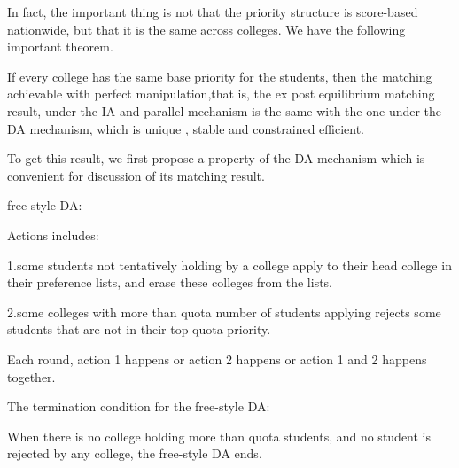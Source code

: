 In fact, the important thing is not that the priority structure is score-based nationwide, but that it is the same across colleges.
We have the following important theorem.

\begin{thm}\label{same}
If every college has the same base priority for the students, then the matching achievable with perfect
manipulation,that is, the ex post equilibrium matching result,  under the IA and parallel mechanism  is the same with the one under the DA mechanism, which is unique , stable and constrained efficient. 
\end{thm}











To get this result, we first propose a property of the DA mechanism which is convenient for discussion of its matching result.
\begin{definition}
  free-style DA:
  
  Actions includes:
  
  1.some students not tentatively holding by a college apply to their head college in their preference lists, and erase these colleges from the lists.
  
  2.some colleges with more than quota number of students applying rejects some students that are not in their top quota priority.

  Each round, action 1 happens or action 2 happens or action 1 and 2 happens together.
  
  
The termination condition for the free-style DA:

 When there is no college holding more than quota students, and no student is rejected by any college, the free-style DA ends.
\end{definition}

